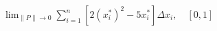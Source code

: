 \item $\displaystyle \lim_{\|P\| \to 0} \sum_{i=1}^n [2(x_i^*)^2 - 5x_i^*] \Delta x_i, \quad [0, 1]$
